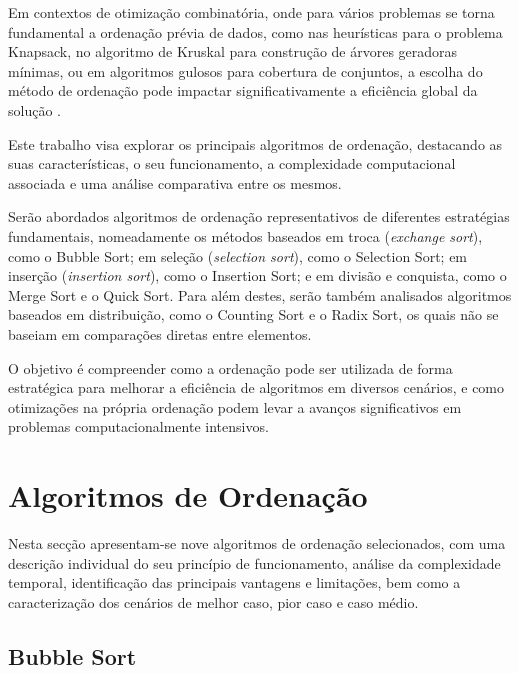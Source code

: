 \documentclass[conference]{IEEEtran}
\begin{document}
Em contextos de otimização combinatória, onde para vários problemas se torna fundamental a ordenação prévia de dados, como nas heurísticas para o problema Knapsack, no algoritmo de Kruskal para construção de árvores geradoras mínimas, ou em algoritmos gulosos para cobertura de conjuntos, a escolha do método de ordenação pode impactar significativamente a eficiência global da solução \cite{deng2025combinatorial}.

Este trabalho visa explorar os principais algoritmos de ordenação, destacando as suas características, o seu funcionamento, a complexidade computacional associada e uma análise comparativa entre os mesmos.

Serão abordados algoritmos de ordenação representativos de diferentes estratégias fundamentais, nomeadamente os métodos baseados em troca (\textit{exchange sort}), como o Bubble Sort; em seleção (\textit{selection sort}), como o Selection Sort; em inserção (\textit{insertion sort}), como o Insertion Sort; e em divisão e conquista, como o Merge Sort e o Quick Sort. Para além destes, serão também analisados algoritmos baseados em distribuição, como o Counting Sort e o Radix Sort, os quais não se baseiam em comparações diretas entre elementos.

O objetivo é compreender como a ordenação pode ser utilizada de forma estratégica para melhorar a eficiência de algoritmos em diversos cenários, e como otimizações na própria ordenação podem levar a avanços significativos em problemas computacionalmente intensivos.

\section{Algoritmos de Ordenação}

Nesta secção apresentam-se nove algoritmos de ordenação selecionados, com uma descrição individual do seu princípio de funcionamento, análise da complexidade temporal, identificação das principais vantagens e limitações, bem como a caracterização dos cenários de melhor caso, pior caso e caso médio.

\subsection{Bubble Sort}

\end{document}
